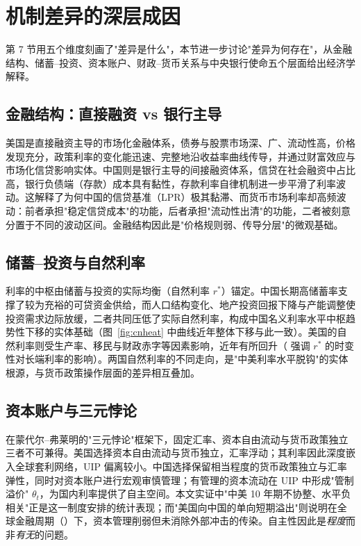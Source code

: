 \documentclass[12pt,a4paper]{ctexart}
\renewcommand{\citealp}[1]{\citep{#1}}
\begin{document}
\section{机制差异的深层成因}
第 7 节用五个维度刻画了"差异是什么"，本节进一步讨论"差异为何存在"，从金融结构、储蓄--投资、资本账户、财政--货币关系与中央银行使命五个层面给出经济学解释。

\subsection{金融结构：直接融资 vs 银行主导}
美国是直接融资主导的市场化金融体系，债券与股票市场深、广、流动性高，价格发现充分，政策利率的变化能迅速、完整地沿收益率曲线传导，并通过财富效应与市场化信贷影响实体。中国则是银行主导的间接融资体系，信贷在社会融资中占比高，银行负债端（存款）成本具有黏性，存款利率自律机制进一步平滑了利率波动。这解释了为何中国的信贷基准（LPR）极其黏滞、而货币市场利率却高频波动：前者承担"稳定信贷成本"的功能，后者承担"流动性出清"的功能，二者被刻意分置于不同的波动区间。金融结构因此是"价格规则弱、传导分层"的微观基础。

\subsection{储蓄--投资与自然利率}
利率的中枢由储蓄与投资的实际均衡（自然利率 $r^{*}$）锚定。中国长期高储蓄率支撑了较为充裕的可贷资金供给，而人口结构变化、地产投资回报下降与产能调整使投资需求边际放缓，二者共同压低了实际自然利率，构成中国名义利率水平中枢趋势性下移的实体基础（图~\ref{fig:cnheat} 中曲线近年整体下移与此一致）。美国的自然利率则受生产率、移民与财政赤字等因素影响，近年有所回升（\citealp{bauer2020} 强调 $r^{*}$ 的时变性对长端利率的影响）。两国自然利率的不同走向，是"中美利率水平脱钩"的实体根源，与货币政策操作层面的差异相互叠加。

\subsection{资本账户与三元悖论}
在蒙代尔--弗莱明的"三元悖论"框架下，固定汇率、资本自由流动与货币政策独立三者不可兼得。美国选择资本自由流动与货币独立，汇率浮动；其利率因此深度嵌入全球套利网络，UIP 偏离较小。中国选择保留相当程度的货币政策独立与汇率弹性，同时对资本账户进行宏观审慎管理；有管理的资本流动在 UIP 中形成"管制溢价" $\theta_t$，为国内利率提供了自主空间。本文实证中"中美 10 年期不协整、水平负相关"正是这一制度安排的统计表现；而"美国向中国的单向短期溢出"则说明在全球金融周期（\citealp{rey2015,miranda2020}）下，资本管理削弱但未消除外部冲击的传染。自主性因此是\emph{程度}而非\emph{有无}的问题。
\end{document}
